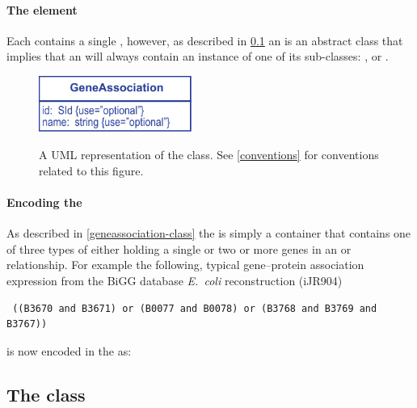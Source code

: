 \paragraph{The  element}
Each \GeneAssociation contains a single \Association, however, as described in \ref{association-class} an \Association is an abstract class that implies that an  will always contain an instance of one of its sub-classes: \GeneAnd, \GeneOr or \Gene.
%
\begin{figure}[h!]
  \centering
  \includegraphics[width=5cm]{images/fbc_uml_ga.pdf}\\
  \caption{A UML representation of the \FBCPackage \GeneAssociation class. See  \ref{conventions} for conventions related to this figure.}
  \label{fig:fbc_uml_ga}
\end{figure}

\paragraph{Encoding the \GeneAssociation}
As described in \ref{geneassociation-class} the \GeneAssociation is simply a container that contains one of three types of \Association either holding a single \Gene or two or more genes in an \GeneAnd or \GeneOr relationship. For example the following, typical gene--protein association expression from the BiGG database \emph{E.~coli} reconstruction (iJR904) \cite{ijr904, bigg}
%
\begin{verbatim}
 ((B3670 and B3671) or (B0077 and B0078) or (B3768 and B3769 and B3767))
\end{verbatim}
%
is now encoded in the \FBCPackage as:
%
\subsection{The \FBC {} class}
\label{association-class}


